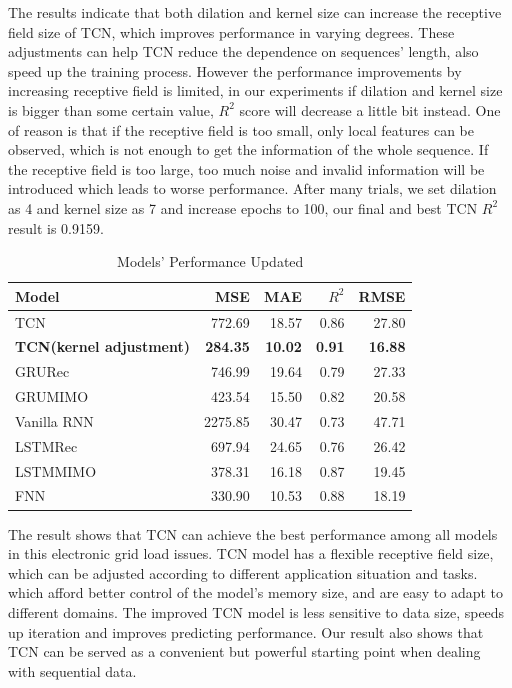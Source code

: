 The results indicate that both dilation and kernel size can increase the receptive field size of TCN, which improves performance in varying degrees. These adjustments can help TCN reduce the dependence on sequences' length, also speed up the training process. However the performance improvements by increasing receptive field is limited, in our experiments if dilation and kernel size is bigger than some certain value, $R^2$ score will decrease a little bit instead. One of reason is that if the receptive field is too small, only local features can be observed, which is not enough to get the information of the whole sequence. If the receptive field is too large, too much noise and invalid information will be introduced which leads to worse performance. After many trials, we set dilation as 4 and kernel size as 7 and increase epochs to 100, our final and best TCN $R^2$ result is 0.9159.
\begin{table}[H]
\centering
\caption{Models' Performance Updated}
\begin{tabular}{l r r r r}
\toprule
\textbf{Model} & \textbf{MSE} & \textbf{MAE} & \textbf{$R^2$}& \textbf{RMSE}\\
\midrule
TCN & 772.69& 18.57& 0.86& 27.80\\
\textbf{TCN(kernel adjustment)} & \textbf{284.35} & \textbf{10.02} & \textbf{\color{red}0.91}& \textbf{16.88}\\
GRU\-Rec & 746.99& 19.64& 0.79& 27.33 \\
GRU\-MIMO& 423.54& 15.50& 0.82& 20.58 \\
Vanilla RNN& 2275.85& 30.47& 0.73& 47.71 \\
LSTM\-Rec & 697.94& 24.65& 0.76& 26.42 \\
LSTM\-MIMO & 378.31& 16.18& 0.87& 19.45 \\
FNN & 330.90& 10.53& 0.88& 18.19 \\
\bottomrule
\end{tabular}
\label{tab:models}
\end{table}

The result shows that TCN can achieve the best performance among all models in this electronic grid load issues. TCN model has a flexible receptive field size, which can be adjusted according to different application situation and tasks. which afford better control of the model’s memory size, and are easy to adapt to different domains. The improved TCN model is less sensitive to data size, speeds up iteration and improves predicting performance. Our result also shows that TCN can be served as a convenient but powerful starting point when dealing with sequential data. 